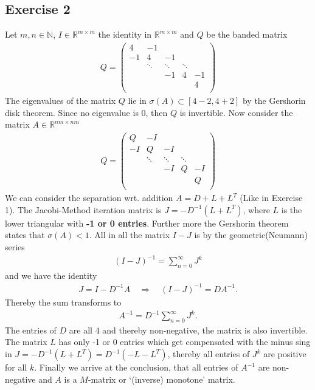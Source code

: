 \subsection{Exercise 2}
Let $m, n \in \mathbb{N}$, $I \in \mathbb{R}^{m\times m}$ the identity in
$\mathbb{R}^{m\times m}$ and $Q$ be the banded matrix
\begin{align}
    Q =
    \begin{pmatrix}
        4  & - 1 &&  &   \\
        -1 &  4& -1&  &   \\
           &\ddots& \ddots & \ddots & \\
           &   &   -1 & 4 & -1\\
           &   &    & & 4 \\
    \end{pmatrix}
\end{align}
The eigenvalues of the matrix $Q$ lie in $\sigma(A) \subset [4-2, 4+2]$ by
the Gershorin disk theorem. Since no eigenvalue is $0$, then $Q$ is
invertible.
Now consider the matrix $A \in \mathbb{R}^{nm \times nm}$
\begin{align}
    Q =
    \begin{pmatrix}
        Q  & - I &  &  & \\
        -I &  Q& -I&    & \\
           &\ddots& \ddots & \ddots & \\
           &     & -I & Q & -I\\
           &     &  & & Q \\
    \end{pmatrix}
\end{align}
We can consider the separation wrt. addition $A = D + L + L^T$ (Like in
Exercise 1). The Jacobi-Method iteration matrix is $J = - D^{-1}(L + L^T)$,
where $L$ is the lower triangular with \textbf{-1 or 0 entries}. Further more
the Gershorin theorem states that $\sigma(A) < 1$. All in all the matrix $I -
J$ is by the geometric(Neumann) series
\begin{align}
    (I-J)^{-1} = \sum_{n=0}^{\infty}J^k
\end{align}
and we have the identity
\begin{align}
    J = I - D^{-1} A \quad \Rightarrow \quad (I-J)^{-1} = DA^{-1}.
\end{align}
Thereby the sum transforms to
\begin{align}
    A^{-1} = D^{-1}\sum_{n=0}^{\infty} J^k.
\end{align}
The entries of $D$ are all $4$ and thereby non-negative, the matrix is also
invertible. The matrix $L$ has only -1 or 0 entries which get compensated
with the minus sing in $J = -D^{-1}(L +L^T) = D^{-1}(-L - L^T)$, thereby all
entries of $J^k$ are positive for all $k$. Finally we arrive at the
conclusion, that all entries of $A^{-1}$ are non-negative and $A$ is a
$M$-matrix or `(inverse) monotone' matrix.
